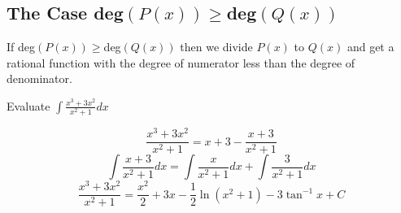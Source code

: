 \documentclass[../main.tex]{subfiles}
\begin{document}
\subsection*{The Case deg$(P(x)) \ge $deg$(Q(x))$}
If deg$(P(x)) \ge $deg$(Q(x))$ then we divide $P(x)$ to $Q(x)$ and get a rational function with the degree of numerator less than the degree of denominator.

\begin{example}
	Evaluate $\displaystyle \int \frac{x^3+3x^2}{x^2+1}dx$
\end{example}
\begin{solution}
	\[
		\frac{x^3+3x^2}{x^2+1} = x + 3 - \frac{x+3}{x^2+1}
	\]
	\[
		\int \frac{x+3}{x^2+1} dx = \int \frac{x}{x^2+1} dx  + \int \frac{3}{x^2+1} dx
	\]
	\[
		\frac{x^3+3x^2}{x^2+1} = \frac{x^2}{2} + 3x - \frac{1}{2} \ln(x^2+1) - 3 \tan^{-1}x + C
	\]
\end{solution}
\end{document}
